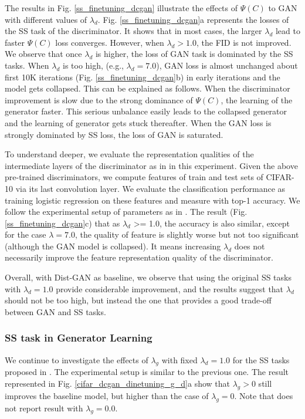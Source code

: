 \documentclass{article}
\begin{document}
The results in Fig. \ref{ss_finetuning_dcgan} illustrate the effects of $\Psi(C)$ to GAN with different values of $\lambda_d$. Fig. \ref{ss_finetuning_dcgan}a represents the losses of the SS task of the discriminator. It shows that in most cases, the larger $\lambda_d$ lead to faster $\Psi(C)$ loss converges. However, when $\lambda_d > 1.0$, the FID is not improved. We observe that once $\lambda_d$ is higher, the loss of GAN task is dominated by the SS tasks. When $\lambda_d$ is too high, (e.g., $\lambda_d = 7.0$), GAN loss is almost unchanged about first 10K iterations (Fig. \ref{ss_finetuning_dcgan}b) in early iterations and the model gets collapsed. 
This can be explained as follows.
When the discriminator improvement is slow due to the strong dominance of $\Psi(C)$, the learning of the generator faster. This serious unbalance easily leads to the collapsed generator and the learning of generator gets stuck thereafter. When the GAN loss is strongly dominated by SS loss, the loss of GAN is saturated.

To understand deeper, we evaluate the representation qualities of the intermediate layers of the discriminator as in  \cite{chen-arxiv-2018} in this experiment. Given the above pre-trained discriminators, we compute features of train and test sets of CIFAR-10 via its last convolution layer. We evaluate the classification performance as training logistic regression on these features and measure with top-1 accuracy. We follow the experimental setup of parameters as in \cite{chen-arxiv-2018}. The result (Fig. \ref{ss_finetuning_dcgan}c) that as $\lambda_d$ >= 1.0, the accuracy is also similar, except for the case $\lambda = 7.0$, the quality of feature is slightly worse but not too significant (although the GAN model is collapsed). It means increasing $\lambda_d$ does not necessarily improve the feature representation quality of the discriminator. 

Overall, 
with Dist-GAN as baseline, we observe that using the original SS tasks with $\lambda_d = 1.0$ provide considerable improvement, and the results suggest that $\lambda_d$ should not be too high, but instead the one that provides a good trade-off between GAN and SS tasks. 


\subsubsection{SS task in Generator Learning}
\label{ss_task_generator_learning}


We continue to investigate the effects of $\lambda_g$ with fixed $\lambda_d = 1.0$
for the SS tasks proposed in 
\cite{chen-arxiv-2018}.
The experimental setup is similar to the previous one. The result represented in Fig. \ref{cifar_dcgan_dinetuning_g_d}a show that $\lambda_g > 0$ still improves the baseline model, but higher than the case of $\lambda_g = 0$. 
Note that 
\cite{chen-arxiv-2018} does not report result with $\lambda_g = 0.0$.
\end{document}
